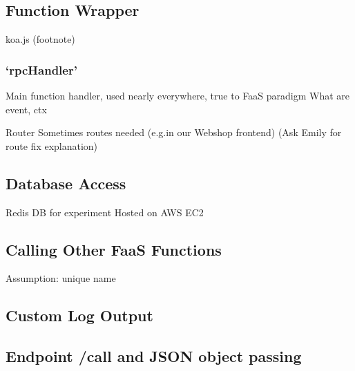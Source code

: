 \documentclass[../main.tex]{subfiles}
\begin{document}
\subsection{Function Wrapper}
koa.js (footnote)

\subsubsection{`rpcHandler'}%
\label{ssub:rpcHandler}
Main function handler, used nearly everywhere, true to FaaS paradigm
What are event, ctx

Router
Sometimes routes needed (e.g.\@ in our Webshop frontend)
(Ask Emily for route fix explanation)

\subsection{Database Access}
Redis DB for experiment
Hosted on AWS EC2

\subsection{Calling Other FaaS Functions}
Assumption: unique name


\subsection{Custom Log Output}

\subsection{Endpoint /call and JSON object passing}
\end{document}
